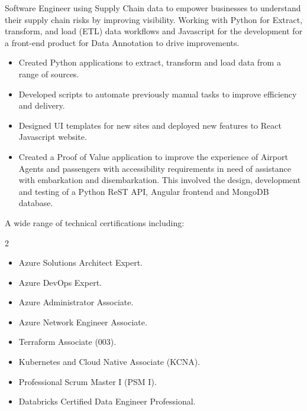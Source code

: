 \documentclass[10pt,a4paper,ragged2e]{maltacv}
\begin{document}
\bigskip\bigskip\bigskip\bigskip\bigskip\bigskip\bigskip\bigskip\bigskip\bigskip


\bigskip

Software Engineer using Supply Chain data to empower businesses to understand their supply chain risks by improving visibility. Working with Python for Extract, transform, and load (ETL) data workflows and Javascript for the development for a front-end product for Data Annotation to drive improvements.

\bigskip

\begin{itemize}
  \item Created Python applications to extract, transform and load data from a range of sources.
  \item Developed scripts to automate previously manual tasks to improve efficiency and delivery.
  \item Designed UI templates for new sites and deployed new features to React Javascript website.
\end{itemize}

\bigskip

\begin{itemize}
  \item Created a Proof of Value application to improve the experience of Airport Agents and passengers with accessibility requirements in need of assistance with embarkation and disembarkation. This involved the design, development and testing of a Python ReST API, Angular frontend and MongoDB database.
\end{itemize}

\divider

\bigskip


\bigskip

{\normalfont
  A wide range of technical certifications including: \
  \smallskip

  \begin{multicols}{2}
    \begin{itemize}
      \item Azure Solutions Architect Expert.
      \item Azure DevOps Expert.
      \item Azure Administrator Associate.
      \item Azure Network Engineer Associate.
      \item Terraform Associate (003).
      \item Kubernetes and Cloud Native Associate (KCNA).
      \item Professional Scrum Master I (PSM I).
      \item Databricks Certified Data Engineer Professional.
    \end{itemize}
  \end{multicols}
}
\end{document}
